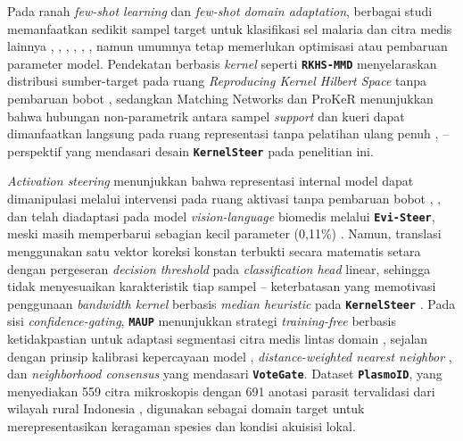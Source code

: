 \documentclass[conference]{IEEEtran}
\newcommand{\nama}[1]{\textbf{\texttt{#1}}}
\begin{document}
Pada ranah \textit{few-shot learning} dan \textit{few-shot domain adaptation}, berbagai studi memanfaatkan sedikit sampel target untuk klasifikasi sel malaria dan citra medis lainnya \cite{b3}, \cite{b4}, \cite{b6}, \cite{b7}, \cite{b8}, \cite{b9}, namun umumnya tetap memerlukan optimisasi atau pembaruan parameter model. Pendekatan berbasis \textit{kernel} seperti \nama{RKHS-MMD} menyelaraskan distribusi sumber-target pada ruang \textit{Reproducing Kernel Hilbert Space} tanpa pembaruan bobot \cite{b14}, sedangkan Matching Networks dan ProKeR menunjukkan bahwa hubungan non-parametrik antara sampel \textit{support} dan kueri dapat dimanfaatkan langsung pada ruang representasi tanpa pelatihan ulang penuh \cite{b16}, \cite{b17} -- perspektif yang mendasari desain \nama{KernelSteer} pada penelitian ini.

\textit{Activation steering} menunjukkan bahwa representasi internal model dapat dimanipulasi melalui intervensi pada ruang aktivasi tanpa pembaruan bobot \cite{b10}, \cite{b11}, dan telah diadaptasi pada model \textit{vision-language} biomedis melalui \nama{Evi-Steer}, meski masih memperbarui sebagian kecil parameter (0,11\%) \cite{b12}. Namun, translasi menggunakan satu vektor koreksi konstan terbukti secara matematis setara dengan pergeseran \textit{decision threshold} pada \textit{classification head} linear, sehingga tidak menyesuaikan karakteristik tiap sampel -- keterbatasan yang memotivasi penggunaan \textit{bandwidth kernel} berbasis \textit{median heuristic} pada \nama{KernelSteer} \cite{b18}. Pada sisi \textit{confidence-gating}, \nama{MAUP} menunjukkan strategi \textit{training-free} berbasis ketidakpastian untuk adaptasi segmentasi citra medis lintas domain \cite{b13}, sejalan dengan prinsip kalibrasi kepercayaan model \cite{b19}, \textit{distance-weighted nearest neighbor} \cite{b20}, dan \textit{neighborhood consensus} \cite{b21} yang mendasari \nama{VoteGate}. Dataset \nama{PlasmoID}, yang menyediakan 559 citra mikroskopis dengan 691 anotasi parasit tervalidasi dari wilayah rural Indonesia \cite{b22}, digunakan sebagai domain target untuk merepresentasikan keragaman spesies dan kondisi akuisisi lokal.
\end{document}
